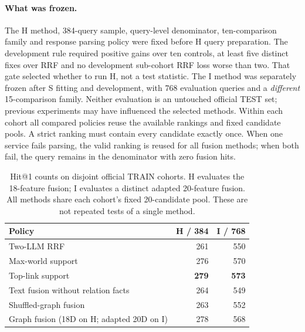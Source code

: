 \documentclass{article}
\begin{document}
\paragraph{What was frozen.}
The H method, 384-query sample, query-level denominator, ten-comparison
family and response parsing policy were fixed before H query preparation.
The development rule required positive gains over ten controls, at least
five distinct fixes over RRF and no development sub-cohort RRF loss worse
than two. That gate selected whether to run H, not a test statistic.
The I method was separately frozen after S fitting and development, with
768 evaluation queries and a \emph{different} 15-comparison family. Neither
evaluation is an untouched official TEST set; previous experiments may
have influenced the selected methods. Within each cohort all compared
policies reuse the available rankings and fixed candidate pools. A strict
ranking must contain every candidate exactly once. When one service fails
parsing, the valid ranking is reused for all fusion methods; when both
fail, the query remains in the denominator with zero fusion hits.
\begin{table}[t]
\centering
\caption{Hit@1 counts on disjoint official TRAIN cohorts. H evaluates the
18-feature fusion; I evaluates a distinct adapted 20-feature fusion. All
methods share each cohort's fixed 20-candidate pool. These are not repeated
tests of a single method.}
\label{tab:main}
\small
\begin{tabular}{lrr}
\toprule
Policy & H / 384 & I / 768 \\
\midrule
Two-LLM RRF & 261 & 550 \\
Max-world support & 276 & 570 \\
Top-link support & \textbf{279} & \textbf{573} \\
Text fusion without relation facts & 264 & 549 \\
Shuffled-graph fusion & 263 & 552 \\
Graph fusion (18D on H; adapted 20D on I) & 278 & 568 \\
\bottomrule
\end{tabular}
\end{table}
\end{document}
